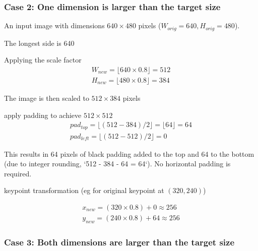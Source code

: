 \subsubsection{Case 2: One dimension is larger than the target size}

An input image with dimensions $640 \times 480$ pixels ($W_{orig}=640, H_{orig}=480$).

\begin{compactitem}
	\item The longest side is 640
	\item Applying the scale factor
	\begin{equation}
		\label{eq:case_2_scale}
		\begin{aligned}
			W_{new} = \lfloor 640 \times 0.8 \rfloor = 512 \\
			H_{new} = \lfloor 480 \times 0.8 \rfloor = 384
		\end{aligned}
	\end{equation}
	\item The image is then scaled to $512 \times 384$ pixels
	\item apply padding to achieve $512 \times 512$
	\begin{equation}
		\label{eq:case_2_padding}
		\begin{aligned}
			pad_{top} = \lfloor (512 - 384) / 2 \rfloor = \lfloor 64 \rfloor = 64 \\
			pad_{left} = \lfloor (512 - 512) / 2 \rfloor = 0
		\end{aligned}
	\end{equation}

	\item This results in 64 pixels of black padding added to the top and 64 to the
	bottom (due to integer rounding, `512 - 384 - 64 = 64`). No horizontal padding
	is required.
	\item keypoint transformation (eg for original keypoint at $(320,240)$)

	\begin{equation}
		\label{eq:case_2_keypoint_transformation}
		\begin{aligned}
			x_{new} = (320 \times 0.8) + 0 \approx 256 \\
			y_{new} = (240 \times 0.8) + 64 \approx 256
		\end{aligned}
	\end{equation}
\end{compactitem}

\subsubsection{Case 3: Both dimensions are larger than the target size}

